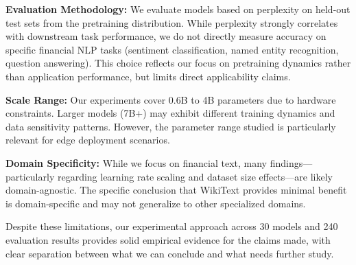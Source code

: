 \textbf{Evaluation Methodology:} We evaluate models based on perplexity on held-out test sets from the pretraining distribution. While perplexity strongly correlates with downstream task performance, we do not directly measure accuracy on specific financial NLP tasks (sentiment classification, named entity recognition, question answering). This choice reflects our focus on pretraining dynamics rather than application performance, but limits direct applicability claims.

\textbf{Scale Range:} Our experiments cover 0.6B to 4B parameters due to hardware constraints. Larger models (7B+) may exhibit different training dynamics and data sensitivity patterns. However, the parameter range studied is particularly relevant for edge deployment scenarios.

\textbf{Domain Specificity:} While we focus on financial text, many findings—particularly regarding learning rate scaling and dataset size effects—are likely domain-agnostic. The specific conclusion that WikiText provides minimal benefit is domain-specific and may not generalize to other specialized domains.

Despite these limitations, our experimental approach across 30 models and 240 evaluation results provides solid empirical evidence for the claims made, with clear separation between what we can conclude and what needs further study.
